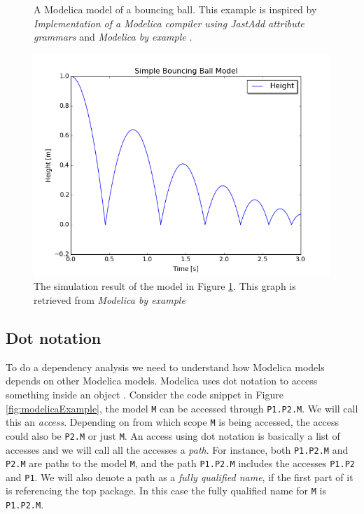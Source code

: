 \documentclass{cslthse-msc}
\begin{document}
\begin{figure}[!htbp]
    \centering
    
    \caption{A Modelica model of a bouncing ball. This example is inspired by \textit{Implementation of a Modelica compiler using JastAdd attribute grammars} \cite{aakesson2010implementation} and \textit{Modelica by example} \cite{tillermodelica}.}
    \label{fig:bouncingBallCode}
\end{figure}

\begin{figure}[!htbp]
    \centering
    \includegraphics[width=1.0\textwidth]{Pictures/BB1.png}
    \caption{The simulation result of the model in Figure \ref{fig:bouncingBallCode}. This graph is retrieved from \textit{Modelica by example} \cite{tillermodelica}}
    \label{fig:bouncingBallSimulation}
\end{figure}

\subsection{Dot notation}
To do a dependency analysis we need to understand how Modelica models depends on other Modelica models. Modelica uses dot notation to access something inside an object \cite{modelicamodelica}. Consider the code snippet in Figure \ref{fig:modelicaExample}, the model \texttt{M} can be accessed through \texttt{P1.P2.M}. We will call this an \emph{access}. Depending on from which scope \texttt{M} is being accessed, the access could also be \texttt{P2.M} or just \texttt{M}. An access using dot notation is basically a list of accesses and we will call all the accesses a \emph{path}. For instance, both \texttt{P1.P2.M} and \texttt{P2.M} are paths to the model \texttt{M}, and the path \texttt{P1.P2.M} includes the accesses \texttt{P1.P2} and \texttt{P1}. We will also denote a path as a \emph{fully qualified name}, if the first part of it is referencing the top package. In this case the fully qualified name for \texttt{M} is \texttt{P1.P2.M}.
\end{document}
